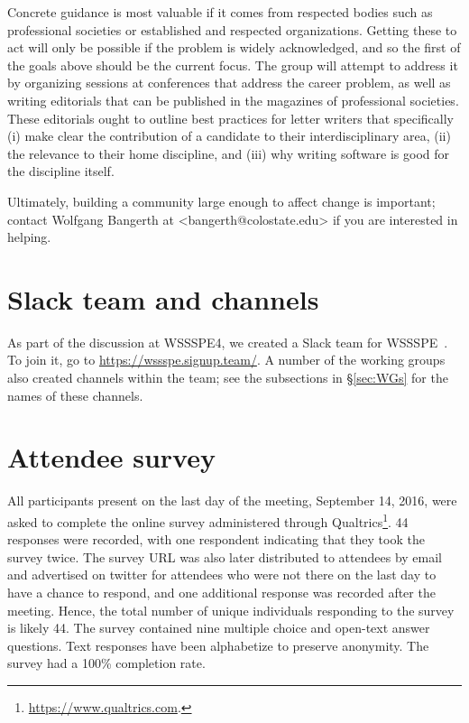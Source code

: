 \documentclass[11pt, oneside]{amsart}
\newcommand{\note}[1]{ {\textcolor{blueish}    { ***Note:      #1 }}}
\begin{document}
Concrete guidance is most valuable if it
comes from respected bodies such as professional societies or
established and respected organizations. Getting these to act
will only be possible if the problem is widely acknowledged, and so
the first of the goals above should be the current focus.
%
The group will attempt to address it by organizing sessions at conferences
that address the career problem, as well as writing editorials that
can be published in the magazines of professional societies. These
editorials ought to outline best practices for letter writers that
specifically (i) make clear the contribution of a candidate to their
interdisciplinary area, (ii) the relevance to their home discipline, and
(iii) why writing software is good for the discipline itself.

Ultimately, building a community large enough
to affect change is important; contact Wolfgang Bangerth at
<bangerth@colostate.edu> if you are interested in helping.



\section{Slack team and channels}\label{sec:slack}


As part of the discussion at WSSSPE4, we created a Slack team for WSSSPE~\cite{WSSSPESlack}.  To join it, go to \url{https://wssspe.signup.team/}.  A number of the working groups also created channels within the team; see the subsections in \S\ref{sec:WGs} for the names of these channels.


\section{Attendee survey \label{sec:survey}}


All participants present on the last day of the meeting, September 14, 2016, were asked to complete the online survey administered through Qualtrics\footnote{\url{https://www.qualtrics.com}.}.
44 responses were recorded, with one respondent indicating that they took the survey twice.
The survey URL was also later distributed to attendees by email and advertised on twitter for attendees who were not there on the last day to have a chance to respond, and one additional response was recorded after the meeting.
Hence, the total number of unique individuals responding to the survey is likely 44.
The survey contained nine multiple choice and open-text answer questions.
Text responses have been alphabetize to preserve anonymity.
The survey had a 100\% completion rate.
\end{document}
